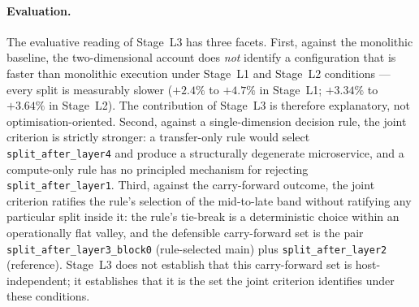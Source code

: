 \paragraph{Evaluation.}
The evaluative reading of Stage~L3 has three facets. First, against the
monolithic baseline, the two-dimensional account does \emph{not}
identify a configuration that is faster than monolithic execution
under Stage~L1 and Stage~L2 conditions --- every split is measurably slower
(\(+2.4\%\) to \(+4.7\%\) in Stage~L1; \(+3.34\%\) to \(+3.64\%\) in
Stage~L2). The contribution of Stage~L3 is therefore explanatory, not
optimisation-oriented. Second, against a single-dimension decision
rule, the joint criterion is strictly stronger: a transfer-only rule
would select \texttt{split\_after\_layer4} and produce a structurally
degenerate microservice, and a compute-only rule has no principled
mechanism for rejecting \texttt{split\_after\_layer1}. Third, against
the carry-forward outcome, the joint criterion ratifies the rule's
selection of the mid-to-late band without ratifying any particular
split inside it: the rule's tie-break is a deterministic choice within
an operationally flat valley, and the defensible carry-forward set is
the pair \texttt{split\_after\_layer3\_block0} (rule-selected main)
plus \texttt{split\_after\_layer2} (reference). Stage~L3 does not
establish that this carry-forward set is host-independent; it
establishes that it is the set the joint criterion identifies under
these conditions.

